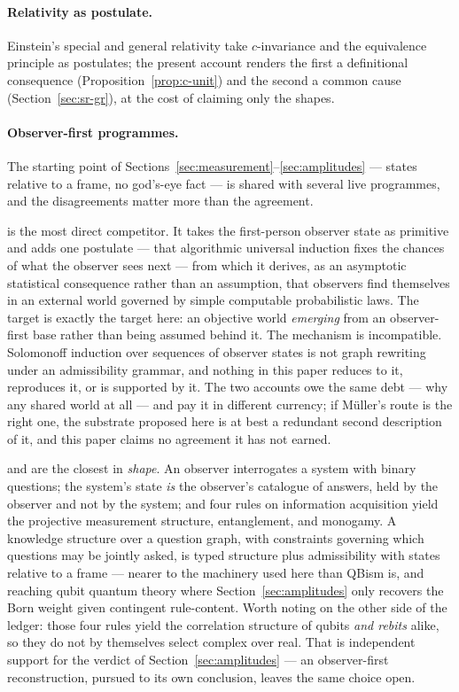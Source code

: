 \documentclass[11pt,a4paper]{article}
\theoremstyle{remark}\newtheorem{remark}[definition]{Remark}
\begin{document}
\paragraph{Relativity as postulate.} Einstein's special \citep{einstein1905} and
general \citep{einstein1916} relativity take $c$-invariance and the equivalence
principle as postulates; the present account renders the first a definitional
consequence (Proposition~\ref{prop:c-unit}) and the second a common cause
(Section~\ref{sec:sr-gr}), at the cost of claiming only the shapes.

\paragraph{Observer-first programmes.} The starting point of
Sections~\ref{sec:measurement}--\ref{sec:amplitudes} --- states relative to a frame, no
god's-eye fact --- is shared with several live programmes, and the disagreements matter
more than the agreement.

\citet{muller2020} is the most direct competitor. It takes the first-person observer
state as primitive and adds one postulate --- that algorithmic universal induction fixes
the chances of what the observer sees next --- from which it derives, as an asymptotic
statistical consequence rather than an assumption, that observers find themselves in an
external world governed by simple computable probabilistic laws. The target is exactly
the target here: an objective world \emph{emerging} from an observer-first base rather
than being assumed behind it. The mechanism is incompatible. Solomonoff induction over
sequences of observer states is not graph rewriting under an admissibility grammar, and
nothing in this paper reduces to it, reproduces it, or is supported by it. The two
accounts owe the same debt --- why any shared world at all --- and pay it in different
currency; if M\"uller's route is the right one, the substrate proposed here is at best a
redundant second description of it, and this paper claims no agreement it has not earned.

\citet{hoehn2017} and \citet{hoehnwever2017} are the closest in \emph{shape}. An observer
interrogates a system with binary questions; the system's state \emph{is} the observer's
catalogue of answers, held by the observer and not by the system; and four rules on
information acquisition yield the projective measurement structure, entanglement, and
monogamy. A knowledge structure over a question graph, with constraints governing which
questions may be jointly asked, is typed structure plus admissibility with states
relative to a frame --- nearer to the machinery used here than QBism is, and reaching
qubit quantum theory where Section~\ref{sec:amplitudes} only recovers the Born weight given
contingent rule-content. Worth noting on the other side of the ledger: those four rules yield
the correlation structure of qubits \emph{and rebits} alike, so they do not by themselves select
complex over real. That is independent support for the verdict of Section~\ref{sec:amplitudes}
--- an observer-first reconstruction, pursued to its own conclusion, leaves the same choice
open.
\end{document}
